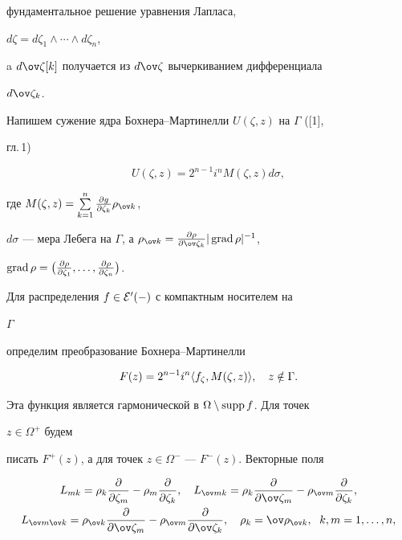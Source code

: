 фундаментальное решение уравнения Лапласа, 


$d\zeta=d\zeta_1\wedge\dotsb\wedge d\zeta_n$, 


a $d\ov\zeta[k]$ получается из $d\ov\zeta$ вычеркиванием дифференциала 


$d\ov\zeta_k$. 


Напишем сужение ядра Бохнера--Мартинелли $U(\zeta,z)$ на $\Gamma$ ([1], 


гл.\,1) 


$$ 


U(\zeta,z)=2^{n-1}i^n M(\zeta,z)d\sigma, 


$$ 


где $M(\zeta,z)=\sum\limits^n_{k=1} 


\frac{\partial g}{\partial \zeta_k}\rho_{\ov k}$, 


$d\sigma$ --- мера Лебега на $\Gamma$, а $\rho_{\ov k}= 


\frac{\partial \rho}{\partial \ov\zeta_k}|\grad \rho|^{-1}$, 


$\grad\rho=\big(\frac{\partial \rho}{\partial \zeta_1},\dotsc, 


\frac{\partial \rho}{\partial \zeta_n}\big)$. 


Для распределения $f\in\cal E'(\Gamma)$ с компактным носителем на 


$\Gamma$ 


определим преобразование Бохнера--Мартинелли 


\begin{equation} 


F(z)=2^{n-1}i^n\la f_\zeta,M(\zeta,z)\ra,\quad z\notin \Gamma. 


\end{equation} 


Эта функция является гармонической в $\Omega\setminus\operatorname{supp} f$. Для точек 


$z\in\Omega^+$ будем 


писать $F^+(z)$, а для точек $z\in\Omega^-$ --- $F^-(z)$. Векторные поля 


\begin{gather*} 


L_{mk}=\rho_k 


\frac{\partial }{\partial \zeta_m}-\rho_m 


\frac{\partial }{\partial \zeta_k},\quad L_{\ov m k}=\rho_k 


\frac{\partial }{\partial \ov\zeta_m}-\rho_{\ov m} 


\frac{\partial }{\partial \zeta_k},\\ 


% 


L_{\ov m\ov k}=\rho_{\ov k} 


\frac{\partial }{\partial \ov \zeta_m}-\rho_{\ov m} 


\frac{\partial }{\partial \ov \zeta_k},\quad 


\rho_k=\ov\rho_{\ov k},\ \; k,m=1,\dotsc,n, 


\end{gather*} 


